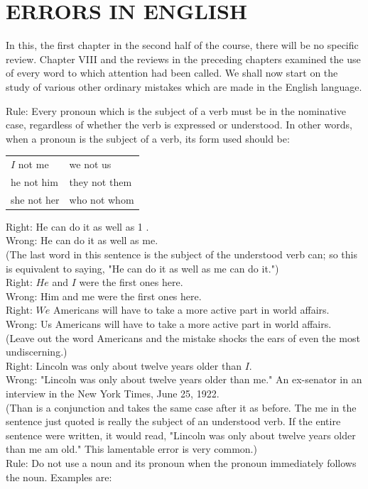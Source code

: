 \documentclass[10pt]{article}
\begin{document}
\section*{ERRORS IN ENGLISH}
In this, the first chapter in the second half of the course, there will be no specific review. Chapter VIII and the reviews in the preceding chapters examined the use of every word to which attention had been called. We shall now start on the study of various other ordinary mistakes which are made in the English language.

Rule: Every pronoun which is the subject of a verb must be in the nominative case, regardless of whether the verb is expressed or understood. In other words, when a pronoun is the subject of a verb, its form used should be:

\begin{center}
\begin{tabular}{ll}
$I$ not me & we not us \\
he not him & they not them \\
she not her & who not whom \\
\end{tabular}
\end{center}

Right: He can do it as well as 1 .\\
Wrong: He can do it as well as me.\\
(The last word in this sentence is the subject of the understood verb can; so this is equivalent to saying, "He can do it as well as me can do it.")\\
Right: $H e$ and $I$ were the first ones here.\\
Wrong: Him and me were the first ones here.\\
Right: $W e$ Americans will have to take a more active part in world affairs.\\
Wrong: Us Americans will have to take a more active part in world affairs.\\
(Leave out the word Americans and the mistake shocks the ears of even the most undiscerning.)\\
Right: Lincoln was only about twelve years older than $I$.\\
Wrong: "Lincoln was only about twelve years older than me." An ex-senator in an interview in the New York Times, June 25, 1922.\\
(Than is a conjunction and takes the same case after it as before. The me in the sentence just quoted is really the subject of an understood verb. If the entire sentence were written, it would read, "Lincoln was only about twelve years older than me am old." This lamentable error is very common.)\\
Rule: Do not use a noun and its pronoun when the pronoun immediately follows the noun. Examples are:
\end{document}
